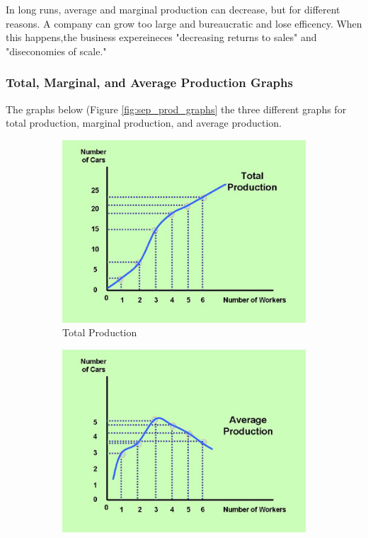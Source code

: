 \documentclass[a4paper, 12pt] {article}
\begin{document}
In long runs, average and marginal production can decrease, but for different
reasons. A company can grow too large and bureaucratic and lose efficency. 
When this happens,the business expereineces "decreasing returns to sales" and 
"diseconomies of scale."

\subsubsection{Total, Marginal, and Average Production Graphs}
The graphs below (Figure \ref{fig:sep_prod_graphs} the three different graphs
for total production, marginal production, and average production.

\begin{figure}[ht]
    \centering
    \begin{subfigure}{0.33\textwidth}
        \centering
        \includegraphics[width=\textwidth] {tot_prod.jpg}
        \caption{Total Production}
        \label{fig:tot_prod}
    \end{subfigure}
    \hspace{1mm}
    \begin{subfigure}{0.33\textwidth}
        \centering
        \includegraphics[width=\textwidth] {avg_prod.jpg}

\end{subfigure}
\end{figure}
\end{document}
